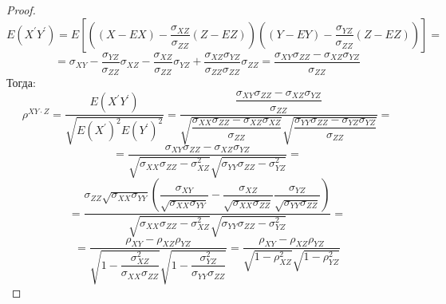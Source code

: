 \begin{proof}
    $$E(X^\prime Y^\prime)=E[((X-EX)-\dfrac{\sigma_{XZ}}{\sigma_{ZZ}}(Z-EZ))((Y-EY)-\dfrac{\sigma_{YZ}}{\sigma_{ZZ}}(Z-EZ))]=$$
    $$=\sigma_{XY}-\dfrac{\sigma_{YZ}}{\sigma_{ZZ}}\sigma_{XZ}-\dfrac{\sigma_{XZ}}{\sigma_{ZZ}}\sigma_{YZ}+
    \dfrac{\sigma_{XZ}\sigma_{YZ}}{\sigma_{ZZ}\sigma_{ZZ}}\sigma_{ZZ}=\dfrac{\sigma_{XY}\sigma_{ZZ}-\sigma_{XZ}\sigma_{YZ}}{\sigma_{ZZ}}$$
    Тогда:
    $$
    \rho^{XY \cdot Z}=\dfrac{E(X^{\prime} Y^{\prime})}{\sqrt{E(X^{\prime})^2 E(Y^{\prime})^2}}=\dfrac{\dfrac{\sigma_{XY}\sigma_{ZZ}-\sigma_{XZ}\sigma_{YZ}}{\sigma_{ZZ}}}
    {\sqrt{
        \dfrac{\sigma_{XX}\sigma_{ZZ}-\sigma_{XZ}\sigma_{XZ}}{\sigma_{ZZ}}
    }\sqrt{
        \dfrac{\sigma_{YY}\sigma_{ZZ}-\sigma_{YZ}\sigma_{YZ}}{\sigma_{ZZ}}
    }}=
    $$
    $$
    =\dfrac{\sigma_{XY} \sigma_{ZZ} - \sigma_{XZ} \sigma_{YZ}}{\sqrt{\sigma_{XX}\sigma_{ZZ}-
    \sigma_{XZ}^2}\sqrt{\sigma_{YY}\sigma_{ZZ}-\sigma_{YZ}^2}}=
    $$
    $$
    =\dfrac{\sigma_{ZZ}\sqrt{\sigma_{XX}\sigma_{YY}}
    \left(\dfrac{\sigma_{XY}}{\sqrt{\sigma_{XX}\sigma_{YY}}} 
    - \dfrac{\sigma_{XZ}}{\sqrt{\sigma_{XX}\sigma_{ZZ}}} \dfrac{\sigma_{YZ}}{\sqrt{\sigma_{YY}\sigma_{ZZ}}}\right)}
    {\sqrt{\sigma_{XX}\sigma_{ZZ}-
    \sigma_{XZ}^2}\sqrt{\sigma_{YY}\sigma_{ZZ}-\sigma_{YZ}^2}}=
    $$
    $$
    =\dfrac{\rho_{XY}-\rho_{XZ}\rho_{YZ}}{\sqrt{1-\dfrac{\sigma_{XZ}^2}{\sigma_{XX}\sigma_{ZZ}}}
    \sqrt{1-\dfrac{\sigma_{YZ}^2}{\sigma_{YY}\sigma_{ZZ}}}}
    =\dfrac{\rho_{XY}-\rho_{XZ}\rho_{YZ}}{\sqrt{1-\rho_{XZ}^2}\sqrt{1-\rho_{YZ}^2}}
    $$
\end{proof}

